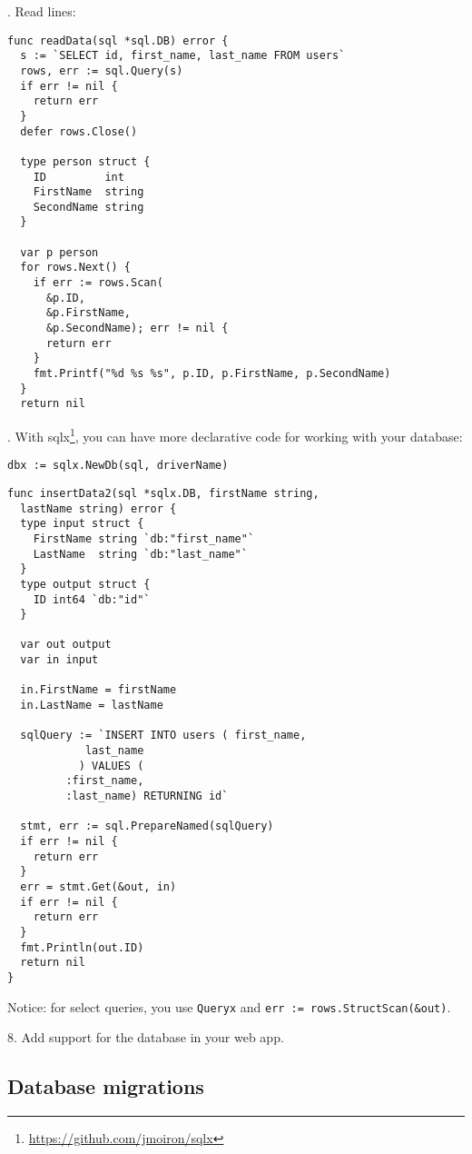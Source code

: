 \documentclass[11pt, letterpaper]{article}
\begin{document}
. Read lines:

\begin{verbatim}
func readData(sql *sql.DB) error {
  s := `SELECT id, first_name, last_name FROM users`
  rows, err := sql.Query(s)
  if err != nil {
    return err
  }
  defer rows.Close()

  type person struct {
    ID         int
    FirstName  string
    SecondName string
  }

  var p person
  for rows.Next() {
    if err := rows.Scan(
      &p.ID,
      &p.FirstName,
      &p.SecondName); err != nil {
      return err
    }
    fmt.Printf("%d %s %s", p.ID, p.FirstName, p.SecondName)
  }
  return nil
\end{verbatim}

. With sqlx\footnote{\href{https://github.com/jmoiron/sqlx}{https://github.com/jmoiron/sqlx}}, you can have more declarative code for working with your database:

\begin{verbatim}
dbx := sqlx.NewDb(sql, driverName)
\end{verbatim}

\begin{verbatim}
func insertData2(sql *sqlx.DB, firstName string,
  lastName string) error {
  type input struct {
    FirstName string `db:"first_name"`
    LastName  string `db:"last_name"`
  }
  type output struct {
    ID int64 `db:"id"`
  }

  var out output
  var in input

  in.FirstName = firstName
  in.LastName = lastName

  sqlQuery := `INSERT INTO users ( first_name,
            last_name
           ) VALUES (
         :first_name,
         :last_name) RETURNING id`

  stmt, err := sql.PrepareNamed(sqlQuery)
  if err != nil {
    return err
  }
  err = stmt.Get(&out, in)
  if err != nil {
    return err
  }
  fmt.Println(out.ID)
  return nil
}
\end{verbatim}

Notice: for select queries, you use \verb|Queryx| and \verb|err := rows.StructScan(&out)|.

\bigskip

8. Add support for the database in your web app.

\subsection{Database migrations}
\end{document}
